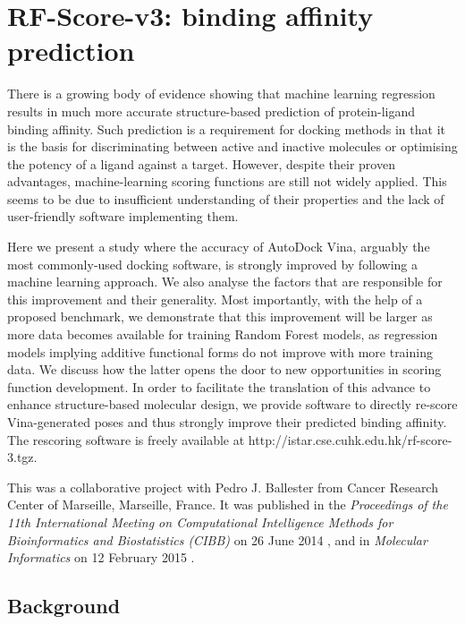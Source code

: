\chapter{RF-Score-v3: binding affinity prediction}
\label{rfscore3}

There is a growing body of evidence showing that machine learning regression results in much more accurate structure-based prediction of protein-ligand binding affinity. Such prediction is a requirement for docking methods in that it is the basis for discriminating between active and inactive molecules or optimising the potency of a ligand against a target. However, despite their proven advantages, machine-learning scoring functions are still not widely applied. This seems to be due to insufficient understanding of their properties and the lack of user-friendly software implementing them.

Here we present a study where the accuracy of AutoDock Vina, arguably the most commonly-used docking software, is strongly improved by following a machine learning approach. We also analyse the factors that are responsible for this improvement and their generality. Most importantly, with the help of a proposed benchmark, we demonstrate that this improvement will be larger as more data becomes available for training Random Forest models, as regression models implying additive functional forms do not improve with more training data. We discuss how the latter opens the door to new opportunities in scoring function development. In order to facilitate the translation of this advance to enhance structure-based molecular design, we provide software to directly re-score Vina-generated poses and thus strongly improve their predicted binding affinity. The rescoring software is freely available at http://istar.cse.cuhk.edu.hk/rf-score-3.tgz.

This was a collaborative project with Pedro J. Ballester from Cancer Research Center of Marseille, Marseille, France. It was published in the \textit{Proceedings of the 11th International Meeting on Computational Intelligence Methods for Bioinformatics and Biostatistics (CIBB)} on 26 June 2014 \citep{1433}, and in \textit{Molecular Informatics} on 12 February 2015 \citep{1647}.

\section{Background}

